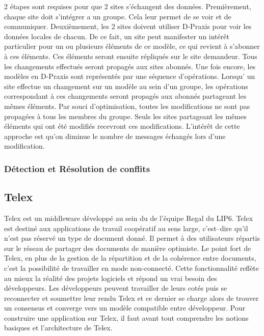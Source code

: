 \documentclass[a4paper,14pt]{article}
\begin{document}
2 étapes sont requises pour que 2 sites s'échangent des données. Premièrement, chaque site doit s'intégrer a un groupe. Cela leur permet de se voir et de communiquer. Deuxièmement, les 2 sites doivent utiliser D-Praxis pour voir les données locales de chacun. De ce fait, un site peut manifester un intérêt particulier pour un ou plusieurs éléments de ce modèle, ce qui revient à s'abonner à ces éléments. Ces éléments seront ensuite répliqués sur le site demandeur. Tous les changements effectués seront propagés aux sites abonnés. 
\newline
\newline
\newline
\newline Une fois encore, les modèles en D-Praxis sont représentés par une séquence d'opérations. Lorsqu' un site effectue un changement sur un  modèle au sein d'un groupe, les opérations correspondant à ces changements seront propagés aux abonnés partageant les mêmes éléments. Par souci d'optimisation, toutes les modifications ne sont pas propagées à tous les membres du groupe. Seuls les sites partageant les mêmes éléments qui ont été modifiés recevront ces modifications. L'intérêt de cette approche est qu'on diminue le nombre de messages échangés lors d'une modification. 
\subsubsection{Détection et Résolution de conflits}




\subsection{Telex}
Telex est un middleware développé au sein du de l'équipe Regal du LIP6. Telex est destiné aux applications de travail coopératif au sens large, c'est--dire qu'il n'est pas réservé  un type de document donné. Il permet à des utilisateurs répartis sur le réseau de partager des documents de manière optimiste. Le point fort de Telex, en plus de la gestion de la répartition et de la cohérence entre documents, c'est la possibilité de travailler en mode non-connecté. Cette fonctionnalité reflète au mieux la réalité des projets logiciels et répond  un vrai besoin des développeurs. Les développeurs peuvent travailler de leurs cotés puis se reconnecter et soumettre leur rendu  Telex et ce dernier se charge alors de trouver un consensus et converge vers un modèle compatible entre développeur.   
Pour construire une application sur Telex, il faut avant tout comprendre les notions basiques et l'architecture de Telex.
\end{document}
